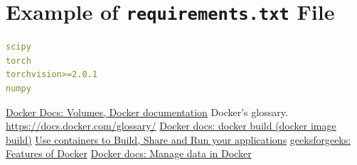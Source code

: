\documentclass{article}
\begin{document}
\section{Example of \texttt{requirements.txt} File}

\begin{lstlisting}[language=yaml]
scipy
torch
torchvision>=2.0.1
numpy
\end{lstlisting}

\begin{thebibliography}{1}
 \href{https://docs.docker.com/storage/volumes/}{Docker Docs: Volumes, Docker documentation}
 Docker's glossary. \url{https://docs.docker.com/glossary/}
 \href{https://docs.docker.com/engine/reference/commandline/image_build/}{Docker docs: docker build (docker image build)}
 \href{https://www.docker.com/resources/what-container/}{Use containers to Build, Share and Run your applications}
 \href{https://www.geeksforgeeks.org/features-of-docker/}{geeksforgeeks: Features of Docker}
 \href{https://docs.docker.com/storage/}{Docker docs: Manage data in Docker}
\end{thebibliography}
\end{document}

